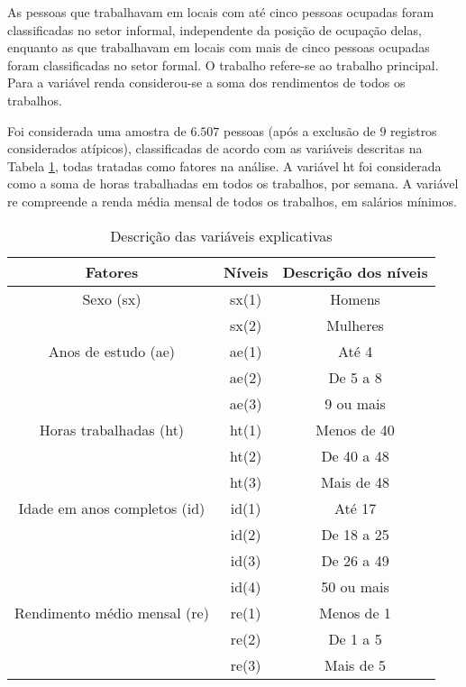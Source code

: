 \documentclass[]{book}
\begin{document}
As pessoas que trabalhavam em locais com até cinco pessoas ocupadas
foram classificadas no setor informal, independente da posição de
ocupação delas, enquanto as que trabalhavam em locais com mais de cinco
pessoas ocupadas foram classificadas no setor formal. O trabalho
refere-se ao trabalho principal. Para a variável renda considerou-se a
soma dos rendimentos de todos os trabalhos.

Foi considerada uma amostra de \(6.507\) pessoas (após a exclusão de
\(9\) registros considerados atípicos), classificadas de acordo com as
variáveis descritas na Tabela \ref{tab61}, todas tratadas como fatores
na análise. A variável ht foi considerada como a soma de horas
trabalhadas em todos os trabalhos, por semana. A variável re compreende
a renda média mensal de todos os trabalhos, em salários mínimos.

\begin{center}
\begin{table}[tbp] \centering%
\caption{Descrição das variáveis explicativas }\bigskip \label{tab61} 
\begin{tabular}{|c|c|c|}
\hline\hline
\textbf{Fatores} & \textbf{Níveis} & \textbf{Descrição dos
níveis} \\ \hline\hline
Sexo (sx) & sx(1) & Homens \\ 
& sx(2) & Mulheres \\ \hline
Anos de estudo (ae) & ae(1) & Até 4 \\ 
& ae(2) & De 5 a 8 \\ 
& ae(3) & 9 ou mais \\ \hline
Horas trabalhadas (ht) & ht(1) & Menos de 40 \\ 
& ht(2) & De 40 a 48 \\ 
& ht(3) & Mais de 48 \\ \hline
Idade em anos completos (id) & id(1) & Até 17 \\ 
& id(2) & De 18 a 25 \\ 
& id(3) & De 26 a 49 \\ 
& id(4) & 50 ou mais \\ \hline
Rendimento médio mensal (re) & re(1) & Menos de 1 \\ 
& re(2) & De 1 a 5 \\ 
& re(3) & Mais de 5 \\ \hline\hline
\end{tabular}
\end{table}%
\end{center}
\end{document}
